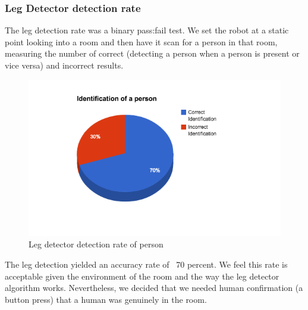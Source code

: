 \documentclass{article}
\begin{document}
	\subsubsection{Leg Detector detection rate}
	The leg detection rate was a binary pass:fail test. We set the robot at a static point looking into a room and then have it scan for a person in that room, measuring the number of correct (detecting a person when a person is present or vice versa) and incorrect results.
	\begin{figure}[H]
	\centering
	\includegraphics[width=\linewidth]{ExperimentalResults11}
	\caption{Leg detector detection rate of person}
	\end{figure}
	The leg detection yielded an accuracy rate of ~70 percent. We feel this rate is acceptable given the environment of the room and the way the leg detector algorithm works. Nevertheless, we decided that we needed human confirmation (a button press) that a human was genuinely in the room.
	
\end{document}
